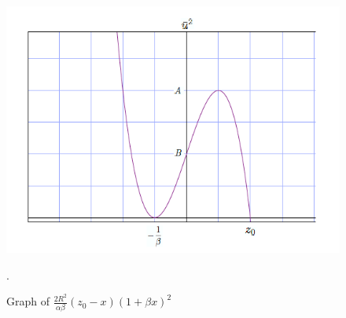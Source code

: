 \begin{figure}
\centering
\includegraphics[scale=0.5]{Graphe7_1}
\caption{Graph of $\frac{2R^2}{\alpha \beta} (z_0-x)(1+\beta x)^2 $}.
\label{Graphe7_1}
\end{figure}

